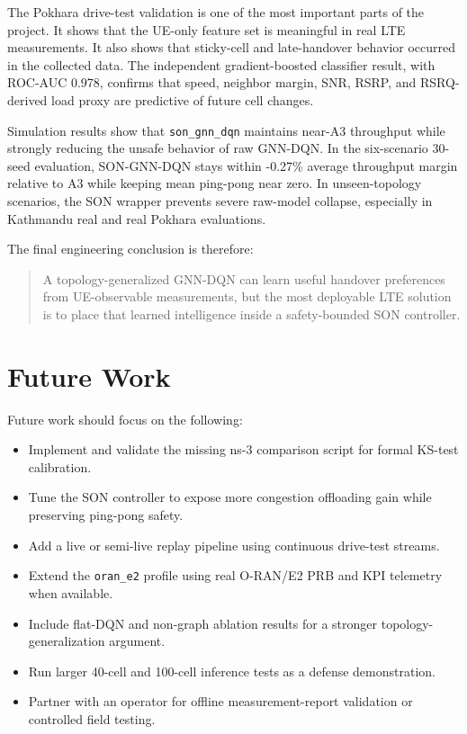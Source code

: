 \documentclass[12pt,a4paper]{report}
\newcommand{\method}{\texttt{son\_gnn\_dqn}}
\newcommand{\orane}{\texttt{oran\_e2}}
\begin{document}
The Pokhara drive-test validation is one of the most important parts of the project. It shows that the UE-only feature set is meaningful in real LTE measurements. It also shows that sticky-cell and late-handover behavior occurred in the collected data. The independent gradient-boosted classifier result, with ROC-AUC 0.978, confirms that speed, neighbor margin, SNR, RSRP, and RSRQ-derived load proxy are predictive of future cell changes.

Simulation results show that \method{} maintains near-A3 throughput while strongly reducing the unsafe behavior of raw GNN-DQN. In the six-scenario 30-seed evaluation, SON-GNN-DQN stays within -0.27\% average throughput margin relative to A3 while keeping mean ping-pong near zero. In unseen-topology scenarios, the SON wrapper prevents severe raw-model collapse, especially in Kathmandu real and real Pokhara evaluations.

The final engineering conclusion is therefore:
\begin{quote}
A topology-generalized GNN-DQN can learn useful handover preferences from UE-observable measurements, but the most deployable LTE solution is to place that learned intelligence inside a safety-bounded SON controller.
\end{quote}

\section{Future Work}
Future work should focus on the following:

\begin{itemize}
    \item Implement and validate the missing ns-3 comparison script for formal KS-test calibration.
    \item Tune the SON controller to expose more congestion offloading gain while preserving ping-pong safety.
    \item Add a live or semi-live replay pipeline using continuous drive-test streams.
    \item Extend the \orane{} profile using real O-RAN/E2 PRB and KPI telemetry when available.
    \item Include flat-DQN and non-graph ablation results for a stronger topology-generalization argument.
    \item Run larger 40-cell and 100-cell inference tests as a defense demonstration.
    \item Partner with an operator for offline measurement-report validation or controlled field testing.
\end{itemize}
\end{document}
